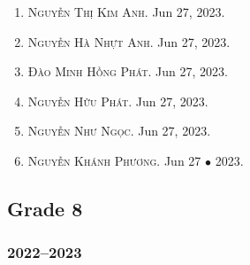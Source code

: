\documentclass{article}
\begin{document}
\begin{enumerate}
	\item \textsc{Nguyễn Thị Kim Anh.} {\sf[In]} Jun 27, 2023.
	\item \textsc{Nguyễn Hà Nhựt Anh.} {\sf[In]} Jun 27, 2023.
	\item \textsc{Đào Minh Hồng Phát.} {\sf[In]} Jun 27, 2023.
	\item \textsc{Nguyễn Hữu Phát.} {\sf[In]} Jun 27, 2023.
	\item \textsc{Nguyễn Như Ngọc.} {\sf[In]} Jun 27, 2023.
	\item \textsc{Nguyễn Khánh Phương.} {\sf[In]} Jun 27 $\bullet$ 2023.
\end{enumerate}

\subsection{Grade 8}

\subsubsection{2022--2023}
\end{document}

